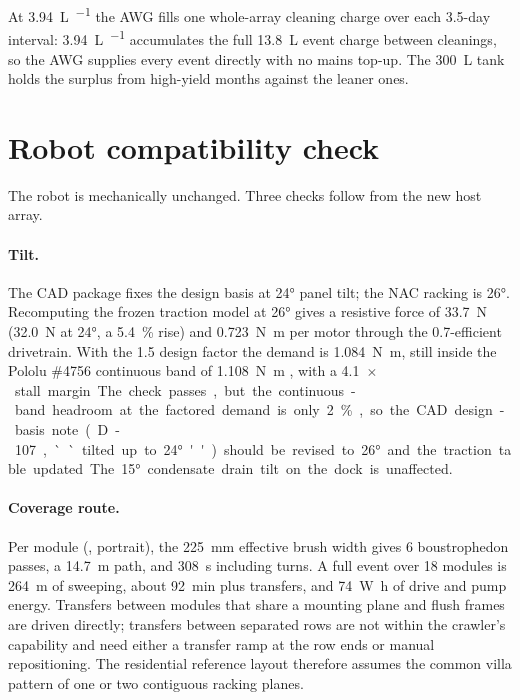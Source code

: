 \documentclass[11pt,a4paper]{article}
\begin{document}
At \SI{3.94}{\liter\per\dy} the AWG fills one whole-array cleaning charge
over each \num{3.5}-day interval: \SI{3.94}{\liter\per\dy} accumulates the
full \SI{13.8}{\liter} event charge between cleanings, so the AWG supplies
every event directly with no mains top-up. The \SI{300}{\liter} tank holds
the surplus from high-yield months against the leaner ones.

\section{Robot compatibility check}
\label{sec:robot}

The robot is mechanically unchanged. Three checks follow from the new
host array.

\paragraph{Tilt.} The CAD package fixes the design basis at \ang{24}
panel tilt; the NAC racking is \ang{26}. Recomputing the frozen traction
model at \ang{26} gives a resistive force of \SI{33.7}{\newton}
(\SI{32.0}{\newton} at \ang{24}, a \SI{5.4}{\percent} rise) and
\SI{0.723}{\newton\metre} per motor through the \num{0.7}-efficient
drivetrain. With the 1.5 design factor the demand is
\SI{1.084}{\newton\metre}, still inside the Pololu \#4756 continuous band
of \SI{1.108}{\newton\metre} \cite{pololu4756}, with a
\SI{4.1}{$\times$} stall margin. The check passes, but the continuous-band
headroom at the factored demand is only \SI{2}{\percent}, so the CAD
design-basis note (D-107, ``tilted up to \ang{24}'') should be revised to
\ang{26} and the traction table updated. The \ang{15} condensate drain
tilt on the dock is unaffected.

\paragraph{Coverage route.} Per module
(, portrait), the
\SI{225}{\milli\metre} effective brush width gives 6 boustrophedon passes,
a \SI{14.7}{\metre} path, and \SI{308}{\second} including turns. A full
event over 18 modules is \SI{264}{\metre} of sweeping, about
\SI{92}{\minute} plus transfers, and \SI{74}{\watt\hour} of drive and pump
energy. Transfers between modules that share a mounting plane and flush
frames are driven directly; transfers between separated rows are not
within the crawler's capability and need either a transfer ramp at the row
ends or manual repositioning. The residential reference layout therefore
assumes the common villa pattern of one or two contiguous racking planes.
\end{document}
